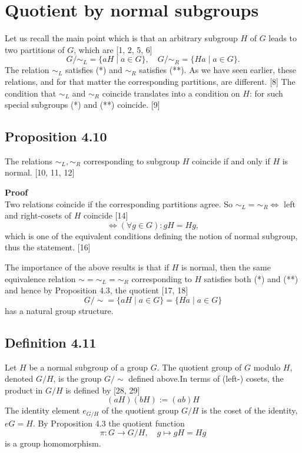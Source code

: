 \section*{Quotient by normal subgroups}

Let us recall the main point which is that an arbitrary subgroup $H$ of $G$ leads to two partitions of $G$, which are [1, 2, 5, 6]
$$G/{\sim_L} = \{aH \mid a \in G\}, \quad G/{\sim_R} = \{Ha \mid a \in G\}. $$
The relation $\sim_L$ satisfies (*) and $\sim_R$ satisfies (**). As we have seen earlier, these relations, and for that matter the corresponding partitions, are different. [8] The condition that $\sim_L$ and $\sim_R$ coincide translates into a condition on $H$: for such special subgroups (*) and (**) coincide. [9]

\subsection*{Proposition 4.10}
The relations $\sim_L, \sim_R$ corresponding to subgroup $H$ coincide if and only if $H$ is normal. [10, 11, 12]

\textbf{Proof} \\
Two relations coincide if the corresponding partitions agree. So $\sim_L = \sim_R \iff$ left and right-cosets of $H$ coincide [14]
$$\iff (\forall g \in G): gH = Hg,$$
which is one of the equivalent conditions defining the notion of normal subgroup, thus the statement. [16]

The importance of the above results is that if $H$ is normal, then the same equivalence relation $\sim = \sim_L = \sim_R$ corresponding to $H$ satisfies both (*) and (**) and hence by Proposition 4.3, the quotient [17, 18]
$$G/\sim = \{aH \mid a \in G\} = \{Ha \mid a \in G\} $$
has a natural group structure.

\subsection*{Definition 4.11}
Let $H$ be a normal subgroup of a group $G$. The quotient group of $G$ modulo $H$, denoted $G/H$, is the group $G/\sim$ defined above.In terms of (left-) cosets, the product in $G/H$ is defined by [28, 29]
$$(aH)(bH) := (ab)H $$
The identity element $e_{G/H}$ of the quotient group $G/H$ is the coset of the identity, $eG = H$. By Proposition 4.3 the quotient function
$$\pi: G \to G/H, \quad g \mapsto gH = Hg$$
is a group homomorphism.

